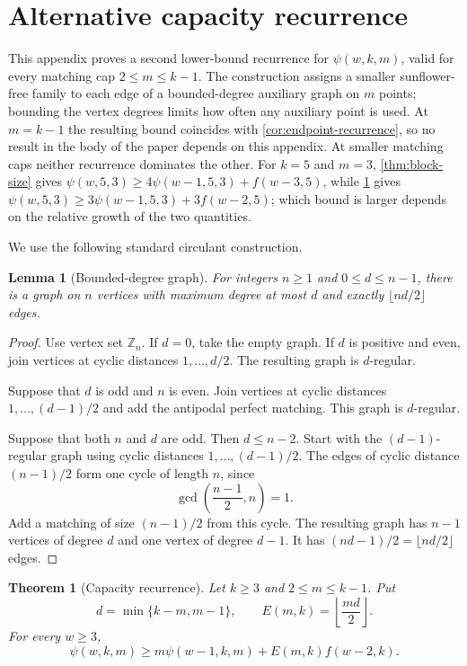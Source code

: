 \documentclass[11pt]{article}
\numberwithin{equation}{section}
\newtheorem{theorem}{Theorem}[section]
\newtheorem{lemma}[lemma]{Lemma}
\theoremstyle{definition}
\theoremstyle{remark}
\newcommand{\Z}{\mathbb Z}
\begin{document}
\appendix

\section{Alternative capacity recurrence}
\label{sec:capacity-appendix}

This appendix proves a second lower-bound recurrence for $\psi(w,k,m)$,
valid for every matching cap $2\le m\le k-1$. The construction assigns a
smaller sunflower-free family to each edge of a bounded-degree auxiliary
graph on $m$ points; bounding the vertex degrees limits how often any
auxiliary point is used. At $m=k-1$ the resulting bound coincides with
\cref{cor:endpoint-recurrence}, so no result in the body of the paper
depends on this appendix. At smaller matching caps neither recurrence
dominates the other. For $k=5$ and $m=3$, \cref{thm:block-size} gives
$\psi(w,5,3)\ge4\psi(w-1,5,3)+f(w-3,5)$, while \cref{thm:capacity} gives
$\psi(w,5,3)\ge3\psi(w-1,5,3)+3f(w-2,5)$; which bound is larger depends on
the relative growth of the two quantities.

We use the following standard circulant construction.

\begin{lemma}[Bounded-degree graph]
\label{lem:bounded-degree-graph}
For integers $n\ge1$ and $0\le d\le n-1$, there is a graph on $n$ vertices
with maximum degree at most $d$ and exactly $\lfloor nd/2\rfloor$ edges.
\end{lemma}

\begin{proof}
Use vertex set $\Z_n$. If $d=0$, take the empty graph. If $d$ is positive
and even, join vertices at cyclic distances $1,\ldots,d/2$. The resulting
graph is $d$-regular.

Suppose that $d$ is odd and $n$ is even. Join vertices at cyclic distances
$1,\ldots,(d-1)/2$ and add the antipodal perfect matching. This graph is
$d$-regular.

Suppose that both $n$ and $d$ are odd. Then $d\le n-2$. Start with the
$(d-1)$-regular graph using cyclic distances $1,\ldots,(d-1)/2$. The edges
of cyclic distance $(n-1)/2$ form one cycle of length $n$, since
\[
 \gcd\left(\frac{n-1}{2},n\right)=1.
\]
Add a matching of size $(n-1)/2$ from this cycle. The resulting graph has
$n-1$ vertices of degree $d$ and one vertex of degree $d-1$. It has
$(nd-1)/2=\lfloor nd/2\rfloor$ edges.
\end{proof}

\begin{theorem}[Capacity recurrence]
\label{thm:capacity}
Let $k\ge3$ and $2\le m\le k-1$. Put
\[
 d=\min\{k-m,m-1\},
 \qquad
 E(m,k)=\left\lfloor\frac{md}{2}\right\rfloor.
\]
For every $w\ge3$,
\begin{equation}
 \psi(w,k,m)
 \ge m\psi(w-1,k,m)+E(m,k)f(w-2,k).
 \label{eq:capacity}
\end{equation}
\end{theorem}
\end{document}
